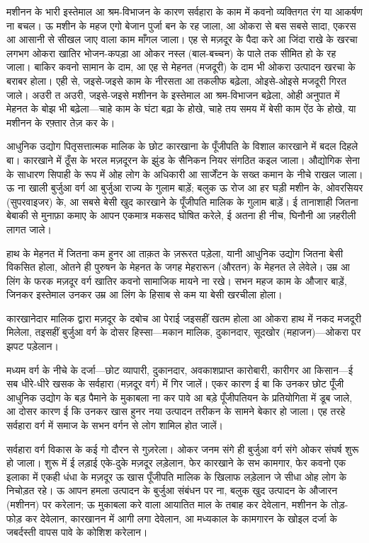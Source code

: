 \documentclass[12pt,a4paper,oneside]{book}
\begin{document}
मशीनन के भारी इस्तेमाल आ श्रम-विभाजन के कारण सर्वहारा के काम में कवनो व्यक्तिगत रंग या आकर्षण ना बचल। ऊ मशीन के महज एगो बेजान पुर्जा बन के रह जाला, आ ओकरा से बस सबसे सादा, एकरस आ आसानी से सीखल जाए वाला काम माँगल जाला। एह से मज़दूर के पैदा करे आ जिंदा राखे के खरचा लगभग ओकरा खातिर भोजन-कपड़ा आ ओकर नस्ल (बाल-बच्चन) के पाले तक सीमित हो के रह जाला। बाकिर कवनो सामान के दाम, आ एह से मेहनत (मजदूरी) के दाम भी ओकरा उत्पादन खरचा के बराबर होला। एही से, जइसे-जइसे काम के नीरसता आ तकलीफ बढ़ेला, ओइसे-ओइसे मजदूरी गिरत जाले। अउरी त अउरी, जइसे-जइसे मशीनन के इस्तेमाल आ श्रम-विभाजन बढ़ेला, ओही अनुपात में मेहनत के बोझ भी बढ़ेला—चाहे काम के घंटा बढ़ा के होखे, चाहे तय समय में बेसी काम ऐंठ के होखे, या मशीनन के रफ़्तार तेज़ कर के।

आधुनिक उद्योग पितृसत्तात्मक मालिक के छोट कारखाना के पूँजीपति के विशाल कारखाने में बदल दिहले बा। कारखाने में ठूँस के भरल मज़दूरन के झुंड के सैनिकन नियर संगठित कइल जाला। औद्योगिक सेना के साधारण सिपाही के रूप में ओह लोग के अधिकारी आ सार्जेंटन के सख्त कमान के नीचे राखल जाला। ऊ ना खाली बुर्जुआ वर्ग आ बुर्जुआ राज्य के गुलाम बाड़ें; बलुक ऊ रोज आ हर घड़ी मशीन के, ओवरसियर (सुपरवाइजर) के, आ सबसे बेसी खुद कारखाने के पूँजीपति मालिक के गुलाम बाड़ें। ई तानाशाही जितना बेबाकी से मुनाफ़ा कमाए के आपन एकमात्र मकसद घोषित करेले, ई अतना ही नीच, घिनौनी आ ज़हरीली लागत जाले।

हाथ के मेहनत में जितना कम हुनर आ ताक़त के ज़रूरत पड़ेला, यानी आधुनिक उद्योग जितना बेसी विकसित होला, ओतने ही पुरुषन के मेहनत के जगह मेहरारून (औरतन) के मेहनत ले लेवेले। उम्र आ लिंग के फरक मज़दूर वर्ग खातिर कवनो सामाजिक मायने ना रखे। सभन महज काम के औजार बाड़ें, जिनकर इस्तेमाल उनकर उम्र आ लिंग के हिसाब से कम या बेसी खरचीला होला।

कारखानेदार मालिक द्वारा मज़दूर के दबोच आ पेराई जइसहीं खतम होला आ ओकरा हाथ में नकद मजदूरी मिलेला, तइसहीं बुर्जुआ वर्ग के दोसर हिस्सा—मकान मालिक, दुकानदार, सूदखोर (महाजन)—ओकरा पर झपट पड़ेलान।

मध्यम वर्ग के नीचे के दर्जा—छोट व्यापारी, दुकानदार, अवकाशप्राप्त कारोबारी, कारीगर आ किसान—ई सब धीरे-धीरे खसक के सर्वहारा (मज़दूर वर्ग) में गिर जालें। एकर कारण ई बा कि उनकर छोट पूँजी आधुनिक उद्योग के बड़ पैमाने के मुकाबला ना कर पावे आ बड़े पूँजीपतियन के प्रतियोगिता में डूब जाले, आ दोसर कारण ई कि उनकर खास हुनर नया उत्पादन तरीकन के सामने बेकार हो जाला। एह तरहे सर्वहारा वर्ग में समाज के सभन वर्गन से लोग शामिल होत जालें।

सर्वहारा वर्ग विकास के कई गो दौरन से गुज़रेला। ओकर जनम संगे ही बुर्जुआ वर्ग संगे ओकर संघर्ष शुरू हो जाला। शुरू में ई लड़ाई एके-दुके मज़दूर लड़ेलान, फेर कारखाने के सभ कामगार, फेर कवनो एक इलाका में एकही धंधा के मज़दूर ऊ खास पूँजीपति मालिक के खिलाफ लड़ेलान जे सीधा ओह लोग के निचोड़त रहे। ऊ आपन हमला उत्पादन के बुर्जुआ संबंधन पर ना, बलुक खुद उत्पादन के औजारन (मशीनन) पर करेलान; ऊ मुकाबला करे वाला आयातित माल के तबाह कर देवेलान, मशीनन के तोड़-फोड़ कर देवेलान, कारखानन में आगी लगा देवेलान, आ मध्यकाल के कामगारन के खोइल दर्जा के जबर्दस्ती वापस पावे के कोशिश करेलान।
\end{document}
